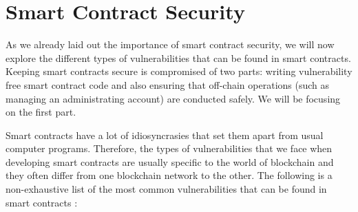 \section{Smart Contract Security} \label{section:smart_contract_security}
As we already laid out the importance of smart contract security, we will now explore the different types of vulnerabilities that can be found in smart contracts.
Keeping smart contracts secure is compromised of two parts: writing vulnerability free smart contract code and also ensuring that off-chain operations (such as managing an administrating account) are conducted safely. We will be focusing on the first part.

Smart contracts have a lot of idiosyncrasies that set them apart from usual computer programs. Therefore, the types of vulnerabilities that we face when developing smart contracts are usually specific to the world of blockchain and they often differ from one blockchain network to the other. The following is a non-exhaustive list of the most common vulnerabilities that can be found in smart contracts \cite{he_smart_2020}:
